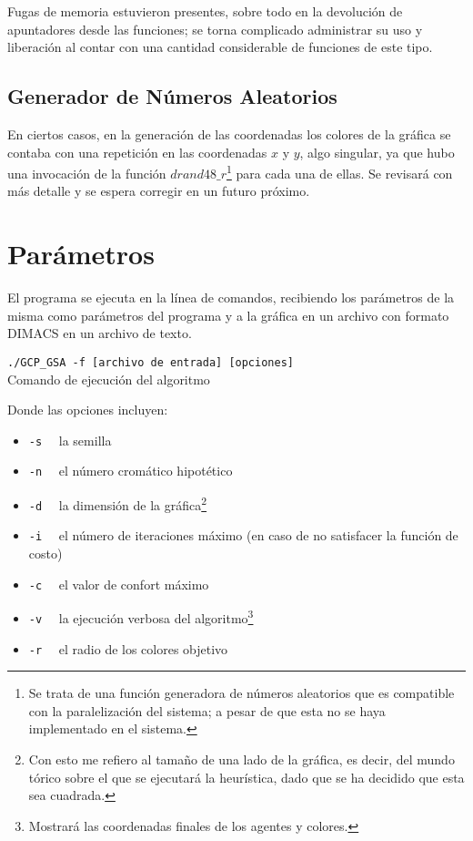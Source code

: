 \documentclass[a4paper]{report}
\begin{document}
Fugas de memoria estuvieron presentes, sobre todo en la devoluci\'on de apuntadores desde las
funciones; se torna complicado administrar su uso y liberaci\'on al contar con una cantidad
considerable de funciones de este tipo.

\subsection{Generador de N\'umeros Aleatorios}
En ciertos casos, en la generaci\'on de las coordenadas los colores de la gr\'afica
se contaba con una repetici\'on en las coordenadas $x$ y $y$, algo singular, ya que
hubo una invocaci\'on de la funci\'on $drand48\_r$\footnote{Se trata de una funci\'on
  generadora de n\'umeros aleatorios que es compatible con la paralelizaci\'on del sistema;
  a pesar de que esta no se haya implementado en el sistema.} para cada una de ellas.
Se revisar\'a con m\'as detalle y se espera corregir en un futuro pr\'oximo.

\section{Par\'ametros}
El programa se ejecuta en la l\'inea de comandos, recibiendo los par\'ametros de la misma
como par\'ametros del programa y a la gr\'afica en un archivo con formato
DIMACS en un archivo de texto.

\begin{center}
  \texttt{./GCP\_GSA -f [archivo de entrada] [opciones]}\\
  \tiny{Comando de ejecuci\'on del algoritmo}
\end{center}

Donde las opciones incluyen:
\begin{itemize}
\item \texttt{-s} \ \ la semilla
\item \texttt{-n} \ \ el n\'umero crom\'atico hipot\'etico
\item \texttt{-d} \ \ la dimensi\'on de la gr\'afica\footnote{Con esto me refiero al
    tama\~no de una lado de la gr\'afica, es decir, del mundo t\'orico sobre el que
    se ejecutar\'a la heur\'istica, dado que se ha decidido que esta sea cuadrada.}
\item \texttt{-i} \ \ el n\'umero de iteraciones m\'aximo (en caso de no satisfacer
  la funci\'on de costo)
\item \texttt{-c} \ \ el valor de confort m\'aximo
\item \texttt{-v} \ \ la ejecuci\'on verbosa del algoritmo\footnote{Mostrar\'a las coordenadas
    finales de los agentes y colores.}
  \item \texttt{-r} \ \ el radio de los colores objetivo
\end{itemize}
\end{document}
